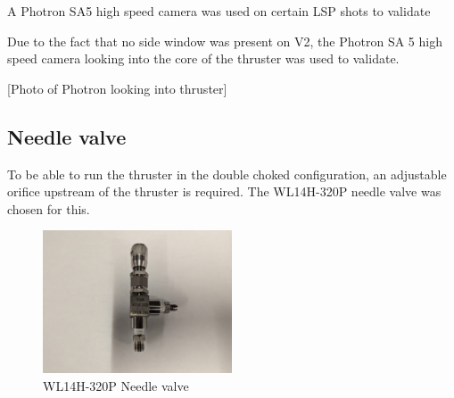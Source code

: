             A Photron SA5 high speed camera was used on certain LSP shots to validate 
            
            Due to the fact that no side window was present on V2, the Photron SA 5 high speed camera looking into the core of the thruster was used to validate.

            [Photo of Photron looking into thruster]

        \subsection{Needle valve}
            
            To be able to run the thruster in the double choked configuration, an adjustable orifice upstream of the thruster is required. The WL14H-320P needle valve was chosen for this.

            \begin{figure}[!ht]
                \centering
                \includegraphics[width=0.50\textwidth]{assets/3 design/Needle valve.jpg}
                \caption{WL14H-320P Needle valve}
                \label{fig:Needle valve}
            \end{figure}